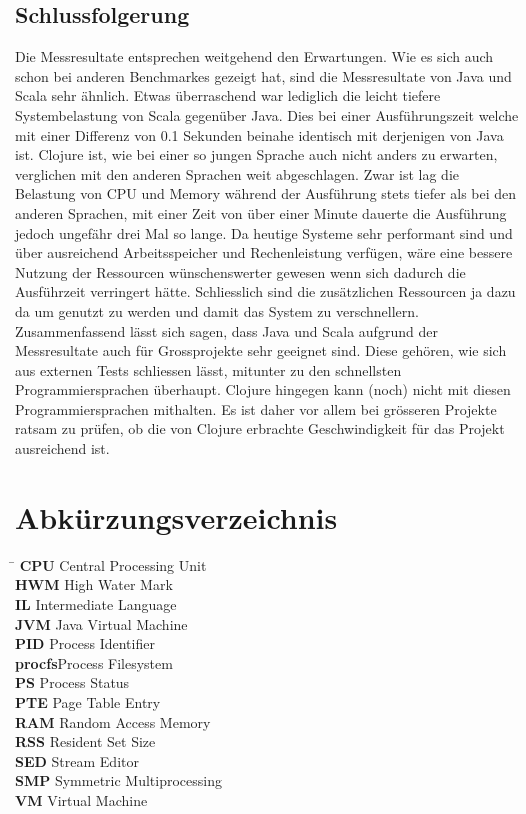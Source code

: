 \documentclass{fancydocument}
\begin{document}
\subsection{Schlussfolgerung}
Die Messresultate entsprechen weitgehend den Erwartungen. Wie es sich auch schon bei anderen Benchmarkes gezeigt hat, sind die Messresultate von Java und Scala sehr ähnlich. Etwas überraschend war lediglich die leicht tiefere Systembelastung von Scala gegenüber Java. Dies bei einer Ausführungszeit welche mit einer Differenz von 0.1 Sekunden beinahe identisch mit derjenigen von Java ist. Clojure ist, wie bei einer so jungen Sprache auch nicht anders zu erwarten, verglichen mit den anderen Sprachen weit abgeschlagen. Zwar ist lag die Belastung von CPU und Memory während der Ausführung stets tiefer als bei den anderen Sprachen, mit einer Zeit von über einer Minute dauerte die Ausführung jedoch ungefähr drei Mal so lange. Da heutige Systeme sehr performant sind und über ausreichend Arbeitsspeicher und Rechenleistung verfügen, wäre eine bessere Nutzung der Ressourcen wünschenswerter gewesen wenn sich dadurch die Ausführzeit verringert hätte. Schliesslich sind die zusätzlichen Ressourcen ja dazu da um genutzt zu werden und damit das System zu verschnellern.
Zusammenfassend lässt sich sagen, dass Java und Scala aufgrund der Messresultate auch für Grossprojekte sehr geeignet sind. Diese gehören, wie sich aus externen Tests schliessen lässt, mitunter zu den schnellsten Programmiersprachen überhaupt. Clojure hingegen kann (noch) nicht mit diesen Programmiersprachen mithalten. Es ist daher vor allem bei grösseren Projekte ratsam zu prüfen, ob die von Clojure erbrachte Geschwindigkeit für das Projekt ausreichend ist.

\section{Abk\"urzungsverzeichnis}
\begin{tabbing}
\hspace*{2cm}\=\kill
\textbf{CPU} \>Central Processing Unit\\
\textbf{HWM} \>High Water Mark\\
\textbf{IL} \>Intermediate Language\\
\textbf{JVM} \>Java Virtual Machine\\
\textbf{PID} \>Process Identifier\\
\textbf{procfs}\>Process Filesystem\\
\textbf{PS} \>Process Status\\
\textbf{PTE} \>Page Table Entry\\
\textbf{RAM} \>Random Access Memory\\
\textbf{RSS} \>Resident Set Size\\
\textbf{SED} \>Stream Editor\\
\textbf{SMP} \>Symmetric Multiprocessing\\
\textbf{VM} \>Virtual Machine\\
\end{tabbing}
\end{document}
